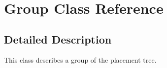 \hypertarget{class_group}{}\section{Group Class Reference}
\label{class_group}


\subsection{Detailed Description}
This class describes a group of the placement tree. 